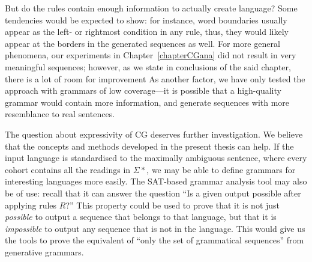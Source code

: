 But do the rules contain enough information to actually create language? 
Some tendencies would be expected to show: for instance, word boundaries usually appear 
as the left- or rightmost condition in any rule, thus, they would likely appear at the borders in the generated sequences as well.
For more general phenomena, our experiments in Chapter~\ref{chapterCGana} 
did not result in very meaningful sequences; 
however, as we state in conclusions of the said chapter, there is a lot of room for improvement 
As another factor, we have only tested the approach with grammars of low coverage---it is possible that a high-quality grammar would contain more information, and generate sequences with more resemblance to real sentences.

The question about expressivity of CG deserves further investigation. 
We believe that the concepts and methods developed in the present thesis can help. 
If the input language is standardised to the maximally ambiguous sentence, 
where every cohort contains all the readings in $\Sigma*$, 
we may be able to define grammars for interesting languages more easily. 
The SAT-based grammar analysis tool may also be of use: recall that it can answer 
the question ``Is a given output possible after applying rules $R$?''
This property could be used to prove that it is not just {\em possible} to output 
a sequence that belongs to that language, but that it is {\em impossible} to output 
any sequence that is not in the language.
This would give us the tools to prove the equivalent of ``only the set of grammatical sequences'' from generative grammars.







